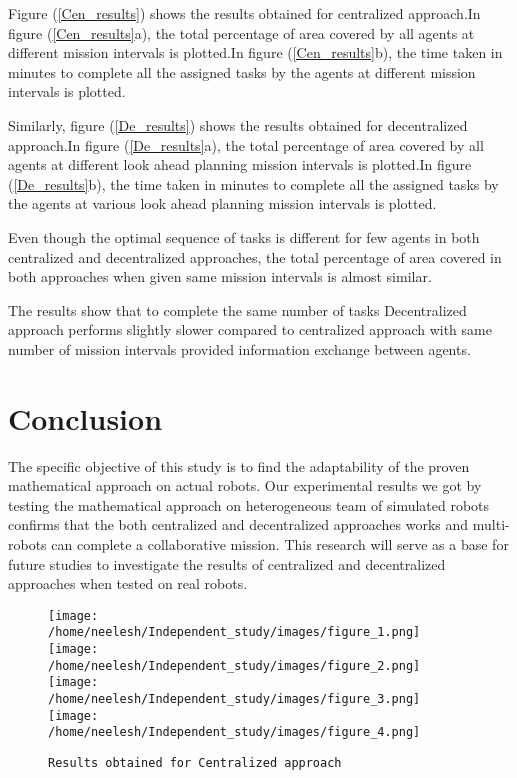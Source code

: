 \documentclass[conference]{IEEEtran}
\begin{document}
{ Figure (\ref{Cen_results}) shows the results obtained for centralized approach.In figure (\ref{Cen_results}a), the total percentage of area covered by all agents at different mission intervals is plotted.In figure (\ref{Cen_results}b), the time taken in minutes to complete all the assigned tasks by the agents at different mission intervals is plotted.

 Similarly, figure (\ref{De_results}) shows the results obtained for decentralized approach.In figure (\ref{De_results}a), the total percentage of area covered by all agents at different look ahead planning mission intervals is plotted.In figure (\ref{De_results}b), the time taken in minutes to complete all the assigned tasks by the agents at various look ahead planning mission intervals is plotted.

Even though the optimal sequence of tasks is different for few agents in both  centralized and decentralized approaches, the total percentage of area covered in both approaches when given same mission intervals is almost similar. 

The results show that to complete the same number of tasks Decentralized approach performs slightly slower compared to centralized approach with same number of mission intervals provided information exchange between agents.


\section{Conclusion}
The specific objective of this study is to find the adaptability of the proven mathematical approach on actual robots. Our experimental results we got by testing the mathematical approach on heterogeneous team of simulated robots confirms that the both centralized and decentralized approaches works and multi-robots can complete a collaborative mission. 
This research will serve as a base for future studies to investigate the results of centralized and decentralized approaches when tested on real robots.
 

\begin{figure}
\hfill\begin{minipage}{0.5\textwidth}\centering
\texttt{[image: /home/neelesh/Independent\_study/images/figure\_1.png]}
\texttt{[image: /home/neelesh/Independent\_study/images/figure\_2.png]}
\texttt{[image: /home/neelesh/Independent\_study/images/figure\_3.png]}
\texttt{[image: /home/neelesh/Independent\_study/images/figure\_4.png]}
\caption{\texttt{Results obtained for Centralized approach}}\label{Cen_agents}
\end{minipage}
\end{figure}

}
\end{document}

